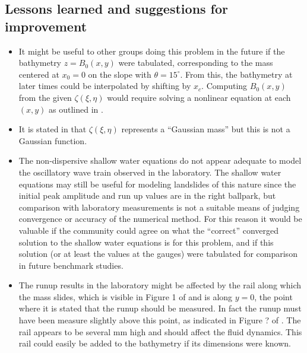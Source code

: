 

\subsection{Lessons learned and suggestions for improvement}

\begin{itemize}
\item It might be useful to other groups doing this problem in the future if
the bathymetry $z=B_0(x,y)$ were tabulated, corresponding to the mass centered
at $x_0=0$ on the slope with $\theta = 15^\circ$.  From this, the bathymetry
at later times could be interpolated by shifting by $x_c$.  Computing
$B_0(x,y)$ from the given $\zeta(\xi,\eta)$ would require solving a
nonlinear equation at each $(x,y)$ as outlined in .

\item It is stated in \cite{bp3description} that $\zeta(\xi,\eta)$
represents a ``Gaussian mass'' but this is not a Gaussian function.

\item The non-dispersive shallow water equations do not appear adequate to
model the oscillatory wave train observed in the laboratory.  The shallow
water equations may still be useful for modeling landslides of this nature
since the initial peak amplitude and run up values are in the right
ballpark, but comparison with laboratory measurements is not a suitable
means of judging convergence or accuracy of the numerical method.  For this
reason it would be valuable if the community could agree on what the
``correct'' converged
solution to the shallow water equations is for this problem, and if this
solution (or at least the values at the gauges) were tabulated for
comparison in future benchmark studies.

\item The runup results in the laboratory might be affected by the rail
along which the mass slides, which is visible in Figure 1 of
\cite{bp3description} and is along $y=0$, the point where it is stated that
the runup should be measured.  In fact the runup must have been measure
slightly above this point, as indicated in Figure ? of
\cite{EnetGrilli}.  The rail appears to be several mm high and should affect
the fluid dynamics.  This rail could easily be added to the bathymetry if
its dimensions were known.  

\end{itemize} 
